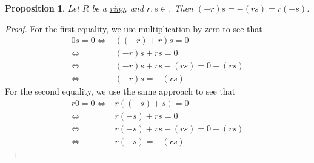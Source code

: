 \documentclass{scrartcl}
\theoremstyle{definition}
\theoremstyle{plain}
\newtheorem{proposition}{Proposition}[section]
\begin{document}
\begin{proposition}
    Let $R$ be a \hyperref[def:ring]{ring}, and $r,s\in $.
    Then $(-r)s=-(rs)=r(-s)$.
\end{proposition}

\begin{proof}
    For the first equality, we use \hyperref[prop:multiply by zero]{multiplication by zero} to see that
    \begin{align}
        0s=0
        \iff& ((-r)+r)s=0 \\
        \iff& (-r)s+rs=0 \\
        \iff& (-r)s+rs-(rs)=0-(rs) \\
        \iff& (-r)s=-(rs)
    \end{align}
    For the second equality, we use the same approach to see that
    \begin{align}
        r0=0
        \iff& r((-s)+s)=0 \\
        \iff& r(-s)+rs=0 \\
        \iff& r(-s)+rs-(rs)=0-(rs) \\
        \iff& r(-s)=-(rs)
    \end{align}
\end{proof}
\end{document}
